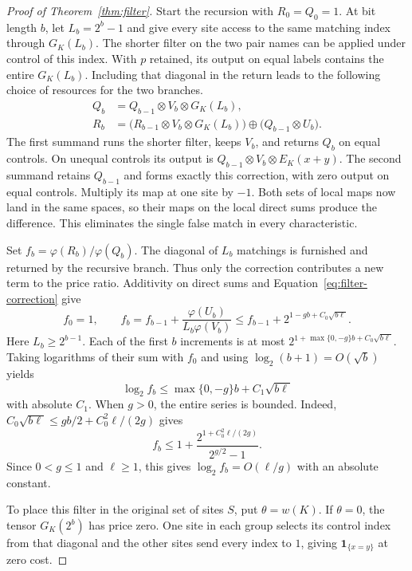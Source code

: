 \begin{proof}[Proof of Theorem~\ref{thm:filter}]
Start the recursion with \(R_0=Q_0=1\). At bit length \(b\), let
\(L_b=2^b-1\) and give every site access to the same matching index
through \(G_K(L_b)\). The shorter filter on the two pair names
can be applied under control of this index. With \(p\) retained,
its output on equal labels contains the entire \(G_K(L_b)\).
Including that diagonal in the return leads to the following choice
of resources for the two branches.
\begin{align*}
 Q_b &= Q_{b-1}\otimes V_b\otimes G_K(L_b),\\
 R_b &= \bigl(R_{b-1}\otimes V_b\otimes G_K(L_b)\bigr)
             \oplus \bigl(Q_{b-1}\otimes U_b\bigr).
\end{align*}
The first summand runs the shorter filter, keeps \(V_b\), and
returns \(Q_b\) on equal controls. On unequal controls its output is
\(Q_{b-1}\otimes V_b\otimes E_K(x+y)\). The second summand retains
\(Q_{b-1}\) and forms exactly this correction, with zero output on
equal controls. Multiply its map at one site by \(-1\).
Both sets of local maps now land in the same spaces, so their maps on
the local direct sums produce the difference. This eliminates the
single false match in every characteristic.

Set \(f_b=\varphi(R_b)/\varphi(Q_b)\). The diagonal of \(L_b\)
matchings is furnished and returned by the recursive branch. Thus
only the correction contributes a new term to the price ratio.
Additivity on direct sums and Equation~\eqref{eq:filter-correction}
give
\[
 f_0=1,\qquad
 f_b=f_{b-1}+\frac{\varphi(U_b)}{L_b\varphi(V_b)}
      \le f_{b-1}+2^{1-gb+C_0\sqrt{b\ell}} .
\]
Here \(L_b\ge 2^{b-1}\). Each of the first \(b\) increments is at most
\(2^{1+\max\{0,-g\}b+C_0\sqrt{b\ell}}\). Taking logarithms of their
sum with \(f_0\) and using \(\log_2(b+1)=O(\sqrt b)\) yields
\[
 \log_2 f_b\le\max\{0,-g\}b+C_1\sqrt{b\ell}
\]
with absolute \(C_1\). When \(g>0\), the entire series is bounded.
Indeed, \(C_0\sqrt{b\ell}\le gb/2+C_0^2\ell/(2g)\) gives
\[
 f_b\le 1+\frac{2^{1+C_0^2\ell/(2g)}}{2^{g/2}-1}.
\]
Since \(0<g\le1\) and \(\ell\ge1\), this gives
\(\log_2 f_b=O(\ell/g)\) with an absolute constant.

To place this filter in the original set of sites \(S\), put
\(\theta=w(K)\). If \(\theta=0\), the tensor \(G_K(2^b)\) has price
zero. One site in each group selects its control index from that
diagonal and the other sites send every index to \(1\), giving
\(\mathbf 1_{\{x=y\}}\) at zero cost.


\end{proof}
